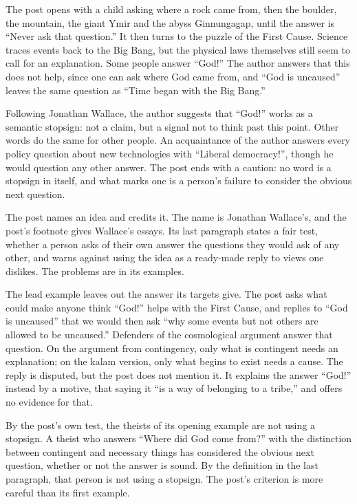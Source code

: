 \begin{afterword}
\summaryhead

The post opens with a child asking where a rock came from, then the boulder, the mountain, the giant Ymir and the abyss Ginnungagap, until the answer is ``Never ask that question.'' It then turns to the puzzle of the First Cause. Science traces events back to the Big Bang, but the physical laws themselves still seem to call for an explanation. Some people answer ``God!'' The author answers that this does not help, since one can ask where God came from, and ``God is uncaused'' leaves the same question as ``Time began with the Big Bang.''

Following Jonathan Wallace, the author suggests that ``God!'' works as a semantic stopsign: not a claim, but a signal not to think past this point. Other words do the same for other people. An acquaintance of the author answers every policy question about new technologies with ``Liberal democracy!'', though he would question any other answer. The post ends with a caution: no word is a stopsign in itself, and what marks one is a person's failure to consider the obvious next question.

\responsehead

The post names an idea and credits it. The name is Jonathan Wallace's, and the post's footnote gives Wallace's essays. Its last paragraph states a fair test, whether a person asks of their own answer the questions they would ask of any other, and warns against using the idea as a ready-made reply to views one dislikes. The problems are in its examples.

The lead example leaves out the answer its targets give. The post asks what could make anyone think ``God!'' helps with the First Cause, and replies to ``God is uncaused'' that we would then ask ``why some events but not others are allowed to be uncaused.'' Defenders of the cosmological argument answer that question. On the argument from contingency, only what is contingent needs an explanation; on the kalam version, only what begins to exist needs a cause. The reply is disputed, but the post does not mention it. It explains the answer ``God!'' instead by a motive, that saying it ``is a way of belonging to a tribe,'' and offers no evidence for that.

By the post's own test, the theists of its opening example are not using a stopsign. A theist who answers ``Where did God come from?'' with the distinction between contingent and necessary things has considered the obvious next question, whether or not the answer is sound. By the definition in the last paragraph, that person is not using a stopsign. The post's criterion is more careful than its first example.


\end{afterword}
